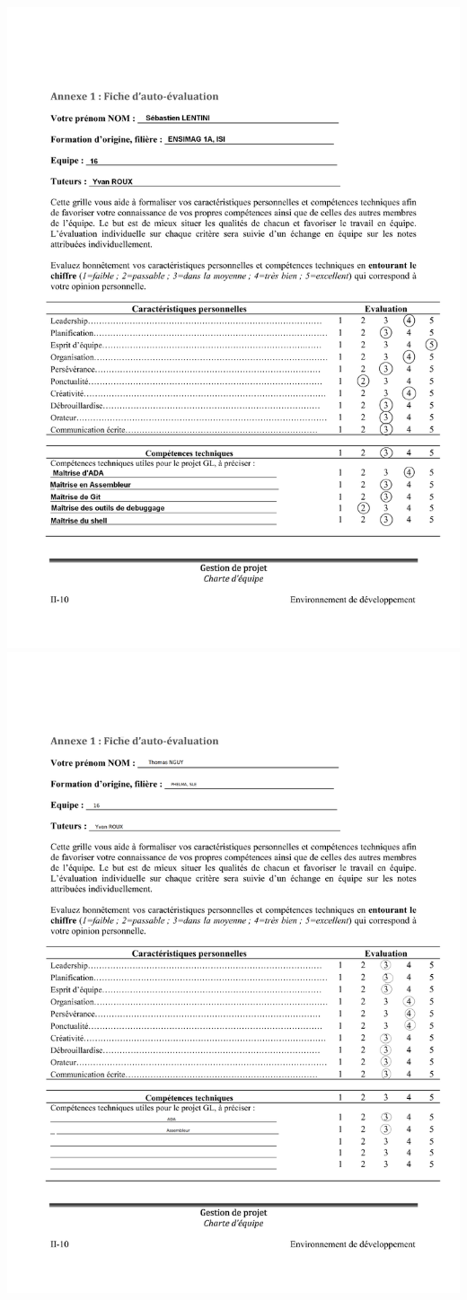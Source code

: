 \documentclass[11pt]{article}
\begin{document}
\includegraphics[scale=0.9]{auto-eval_Sebastien.png}
\newpage
\includegraphics[scale=0.2]{auto-eval_Thomas.png}
\end{document}
